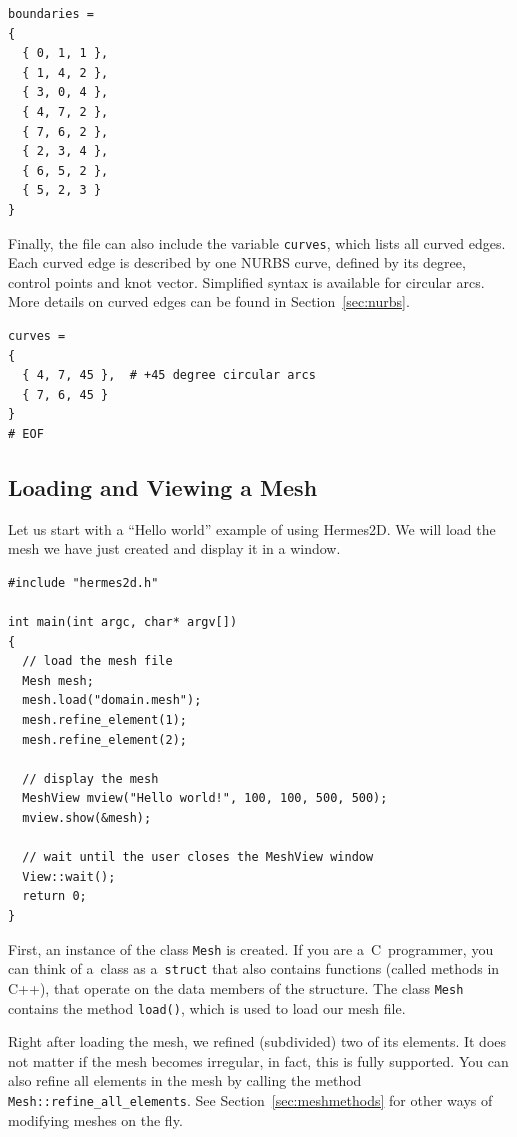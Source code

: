 \begin{lstlisting}
boundaries =
{
  { 0, 1, 1 },
  { 1, 4, 2 },
  { 3, 0, 4 },
  { 4, 7, 2 },
  { 7, 6, 2 },
  { 2, 3, 4 },
  { 6, 5, 2 },
  { 5, 2, 3 }
}
\end{lstlisting}

Finally, the file can also include the variable {\tt curves}, which lists all curved edges.
Each curved edge is described by one NURBS curve, defined by its degree, control points and
knot vector. Simplified syntax is available for circular arcs. 
More details on curved edges can be found in
Section~\ref{sec:nurbs}.

\begin{lstlisting}
curves =
{
  { 4, 7, 45 },  # +45 degree circular arcs
  { 7, 6, 45 }
}
# EOF
\end{lstlisting}



\subsection{Loading and Viewing a Mesh}

Let us start with a ``Hello world'' example of using Hermes2D. We will load the mesh
we have just created and display it in a window.

\lstset{language=C++}
\begin{lstlisting}
#include "hermes2d.h"

int main(int argc, char* argv[])
{
  // load the mesh file
  Mesh mesh;
  mesh.load("domain.mesh");
  mesh.refine_element(1);
  mesh.refine_element(2);

  // display the mesh
  MeshView mview("Hello world!", 100, 100, 500, 500);
  mview.show(&mesh);

  // wait until the user closes the MeshView window
  View::wait();
  return 0;
}
\end{lstlisting}

First, an instance of the class {\tt Mesh} is created. If you are
a~C~programmer, you can think of a~class as a~{\tt struct} that also contains functions
(called methods in C++), that operate on the data members of the structure.
The class {\tt Mesh} contains the method {\tt load()}, which is used to load our mesh file.

Right after loading the mesh, we refined (subdivided) two of its elements. It does not
matter if the mesh becomes irregular, in fact, this is fully supported. You can also
refine all elements in the mesh by calling the method \verb"Mesh::refine_all_elements".
See Section~\ref{sec:meshmethods} for other ways of modifying meshes on the fly.

